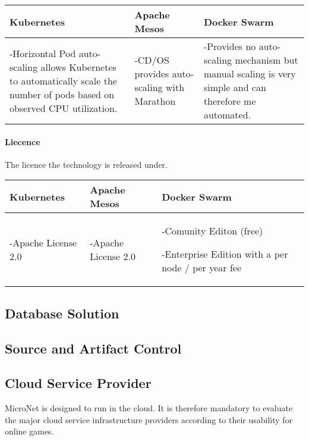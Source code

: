 \begin{center}
  \begin{tabular}{ | p{4.5cm} | p{4.5cm} | p{4.5cm} | }
    \hline
    \textbf{Kubernetes}&\textbf{Apache Mesos}&\textbf{Docker Swarm}\\\hline
    -Horizontal Pod auto-scaling allows Kubernetes to automatically scale the
    number of pods based on observed CPU utilization. & 
    
    -CD/OS provides auto-scaling with Marathon & 
    
    -Provides no auto-scaling mechanism but manual scaling is very simple and
    can therefore me automated.
    \\
    \hline
  \end{tabular}
\end{center}

\paragraph{Liecence}

The licence the technology is released under.

\begin{center}
  \begin{tabular}{ | p{4.5cm} | p{4.5cm} | p{4.5cm} | }
    \hline
    \textbf{Kubernetes}&\textbf{Apache Mesos}&\textbf{Docker Swarm}\\\hline
    -Apache License 2.0 & 
    
    -Apache License 2.0 & 
    
    -Comunity Editon (free) 
    
    -Enterprise Edition with a per node / per year fee\\
    \hline
  \end{tabular}
\end{center}
 
\subsection{Database Solution}
\subsection{Source and Artifact Control}
\subsection{Cloud Service Provider}

MicroNet is designed to run in the cloud. It is therefore mandatory to evaluate
the major cloud service infrastructure providers according to their usability
for online games.

